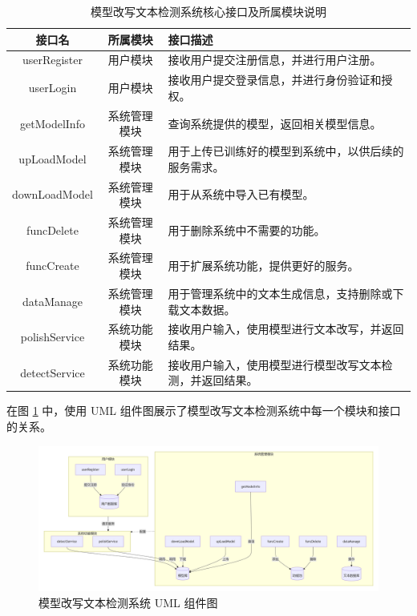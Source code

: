 \begin{table}[htb]
    \centering
    \caption{模型改写文本检测系统核心接口及所属模块说明}
    \label{tab:sys-interfaces}
    \begin{tabular}{ccl}
        \toprule
        \textbf{接口名} & \textbf{所属模块} & \textbf{接口描述} \\
        \midrule
        userRegister & 用户模块 & 接收用户提交注册信息，并进行用户注册。 \\
        userLogin & 用户模块 & 接收用户提交登录信息，并进行身份验证和授权。 \\
        getModelInfo & 系统管理模块 & 查询系统提供的模型，返回相关模型信息。 \\
        upLoadModel & 系统管理模块 & 用于上传已训练好的模型到系统中，以供后续的服务需求。 \\
        downLoadModel & 系统管理模块 & 用于从系统中导入已有模型。 \\
        funcDelete & 系统管理模块 & 用于删除系统中不需要的功能。 \\
        funcCreate & 系统管理模块 & 用于扩展系统功能，提供更好的服务。 \\
        dataManage & 系统管理模块 & 用于管理系统中的文本生成信息，支持删除或下载文本数据。 \\
        polishService & 系统功能模块 & 接收用户输入，使用模型进行文本改写，并返回结果。 \\
        detectService & 系统功能模块 & 接收用户输入，使用模型进行模型改写文本检测，并返回结果。 \\
        \bottomrule
    \end{tabular}
\end{table}

在图 \ref{fig:UML} 中，使用 UML 组件图展示了模型改写文本检测系统中每一个模块和接口的关系。

\begin{figure}[htb]
    \centering
    \includegraphics[width=\textwidth]{figures/UML.png}
    \caption{模型改写文本检测系统 UML 组件图}
    \label{fig:UML}
\end{figure}

